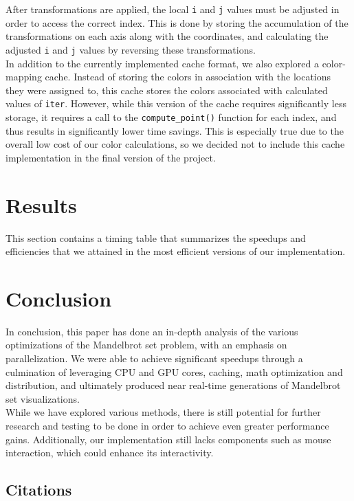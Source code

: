 \documentclass{article}
\begin{document}
After transformations are applied, the local \verb|i| and \verb|j| values
must be adjusted in order to access the correct index.
This is done by storing the accumulation of the transformations on each 
axis along with the coordinates, and calculating the adjusted \verb|i| and
\verb|j| values by reversing these transformations.\\

In addition to the currently implemented cache format, we also explored a
color-mapping cache.
Instead of storing the colors in association with the locations they were 
assigned to, this cache stores the colors associated with calculated values
of \verb|iter|.
However, while this version of the cache requires significantly less 
storage, it requires a call to the \verb|compute_point()| function for each
index, and thus results in significantly lower time savings.
This is especially true due to the overall low cost of our color 
calculations, so we decided not to include this cache implementation in the
final version of the project.

\section{Results}

This section contains a timing table that summarizes the speedups and 
efficiencies that we attained in the most efficient versions of our 
implementation. 

\section{Conclusion}

In conclusion, this paper has done an in-depth analysis of the various 
optimizations of the Mandelbrot set problem, with an emphasis on 
parallelization.
We were able to achieve significant speedups through a culmination of 
leveraging CPU and GPU cores, caching, math optimization and distribution,
and ultimately produced near real-time generations of Mandelbrot set 
visualizations.\\

While we have explored various methods, there is still potential for 
further research and testing to be done in order to achieve even greater 
performance gains.
Additionally, our implementation still lacks components such as mouse 
interaction, which could enhance its interactivity.

\pagebreak

\begin{center}

\section*{Citations}

\end{center}
\end{document}
